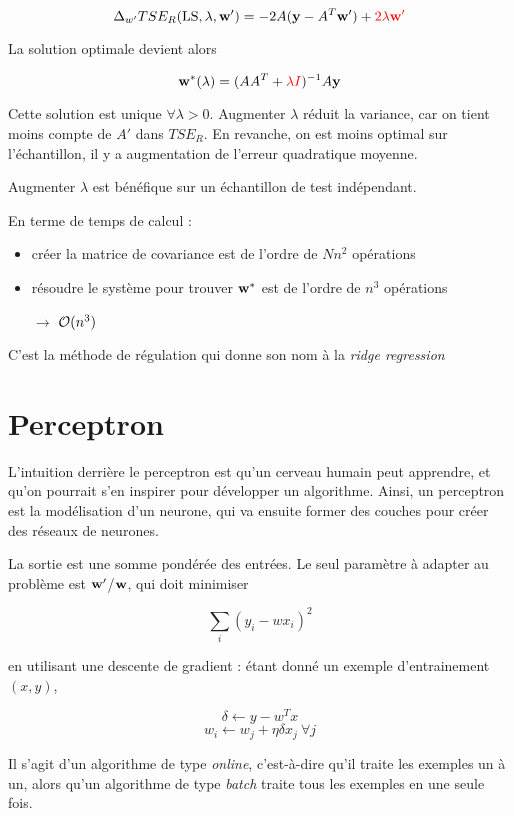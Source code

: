 	$$\Delta_{w'} TSE_R(\text{LS}, \lambda, \textbf{w}') = -2 A (\textbf{y} - A^T\textbf{w}') + \textcolor{red}{2 \lambda \textbf{w}'}$$
	
	La solution optimale devient alors
	
	$$\textbf{w}^*(\lambda) = (A A^T + \textcolor{red}{\lambda I})^{-1} A \textbf{y}$$
	
	Cette solution est unique $\forall \lambda > 0$. Augmenter $\lambda$ réduit la variance, car on tient moins compte de $A'$ dans $TSE_R$. En revanche, on est moins optimal sur l'échantillon, il y a augmentation de l'erreur quadratique moyenne.
		
		
	Augmenter $\lambda$ est bénéfique sur un échantillon de test indépendant.
	
	En terme de temps de calcul :
	
	\begin{itemize}
		\item créer la matrice de covariance est de l'ordre de $N n^2$ opérations
		\item résoudre le système pour trouver $\textbf{w}^*$ est de l'ordre de $n^3$ opérations
		\item[$\rightarrow$] $\mathcal{O}(n^3)$
	\end{itemize}
	
	
	C'est la méthode de régulation qui donne son nom à la \textit{ridge regression}
	
	
\section{Perceptron}
	
L'intuition derrière le perceptron est qu'un cerveau humain peut apprendre, et qu'on pourrait s'en inspirer pour développer un algorithme. Ainsi, un perceptron est la modélisation d'un neurone, qui va ensuite former des couches pour créer des réseaux de neurones.
	
	
La sortie est une somme pondérée des entrées. Le seul paramètre à adapter au problème est $\textbf{w}'$/$\textbf{w}$, qui doit minimiser
	
$$\sum_i (y_i - wx_i)^2$$

en utilisant une descente de gradient : étant donné un exemple d'entrainement $(x, y)$,

$$\delta \leftarrow y - w^Tx$$
$$w_i \leftarrow w_j + \eta \delta x_j \: \forall j$$

Il s'agit d'un algorithme de type \textit{online}, c'est-à-dire qu'il traite les exemples un à un, alors qu'un algorithme de type \textit{batch} traite tous les exemples en une seule fois.

